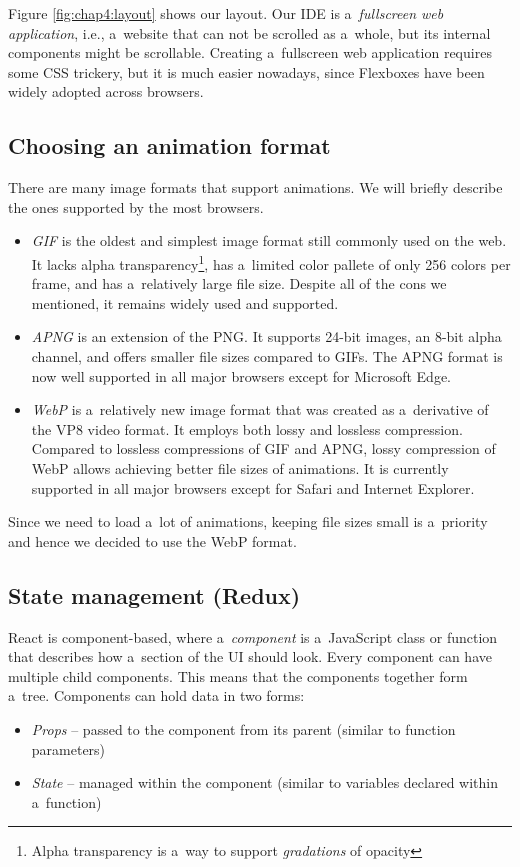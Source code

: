 Figure \ref{fig:chap4:layout} shows our layout. Our IDE is a~\emph{fullscreen web application}, i.e., a~website that can not be scrolled as a~whole, but
its internal components might be scrollable. Creating a~fullscreen web application requires some CSS trickery, but it is much easier nowadays, since Flexboxes
have been widely adopted across browsers.

\subsection{Choosing an animation format}
There are many image formats that support animations. We will briefly describe the ones supported by the most browsers.
\begin{itemize}
    \item \emph{GIF} is the oldest and simplest image format still commonly used on the web. It lacks alpha transparency\footnote{Alpha transparency is a~way to
    support \emph{gradations} of opacity}, has a~limited color pallete of only 256 colors per frame, and has a~relatively large file size.
    Despite all of the cons we mentioned, it remains widely used and supported.

    \item \emph{APNG} is an extension of the PNG. It supports 24-bit images, an 8-bit alpha channel, and offers smaller file sizes compared to GIFs. The APNG format
    is now well supported in all major browsers except for Microsoft Edge.

    \item \emph{WebP} is a~relatively new image format that was created as a~derivative of the VP8 video format. It employs both lossy and lossless compression.
    Compared to lossless compressions of GIF and APNG, lossy compression of WebP allows achieving better file sizes of animations. It is currently supported
    in all major browsers except for Safari and Internet Explorer.
\end{itemize}

Since we need to load a~lot of animations, keeping file sizes small is a~priority and hence we decided to use the WebP format.

\subsection{State management (Redux)}
React is component-based, where a~\emph{component} is a~JavaScript class or function that describes how a~section of the UI should look. 
Every component can have multiple child components. This means that the components together form a~tree. Components can hold data in
two forms:
\begin{itemize}
    \item \emph{Props} -- passed to the component from its parent (similar to function parameters)
    \item \emph{State} -- managed within the component (similar to variables declared within a~function)
\end{itemize}

